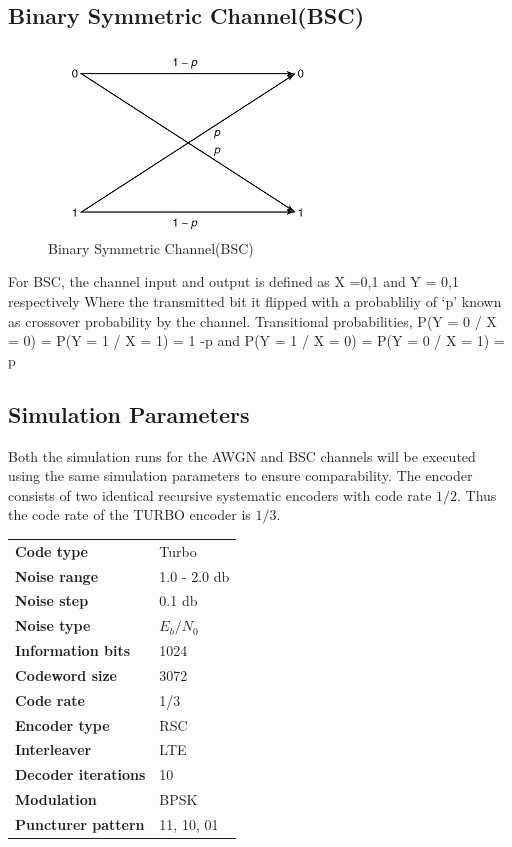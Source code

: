 \documentclass[conference,a4paper]{IEEEtran}
\begin{document}
\subsection{Binary Symmetric Channel(BSC)
}
\begin{figure}[h!]
    \centering
    \includegraphics[scale=0.48]{fig16.jpg}
    \caption{Binary Symmetric Channel(BSC)}
    \label{fig:my_label}
\end{figure}

For BSC, the channel input and output is defined as X ={0,1} and Y = {0,1} respectively
Where the transmitted bit it flipped with a probabliliy of  ‘p’ known as crossover probability by the channel. Transitional probabilities, P(Y = 0 / X = 0) = P(Y = 1 / X = 1) = 1 -p
and P(Y = 1 / X = 0) = P(Y = 0 / X = 1) = p


\subsection{Simulation Parameters}

Both the simulation runs for the AWGN and BSC channels will be executed using the same simulation parameters to ensure comparability. The encoder consists of two identical recursive systematic encoders with code rate $1/2$. Thus the code rate of the TURBO encoder is $1/3$. 

\begin{table}[!htbp]
\centering
\begin{tabular}{|l|l|}
\textbf{Code type }         & Turbo         \\
\textbf{Noise range}        & 1.0 - 2.0 db  \\
\textbf{Noise step}         & 0.1 db        \\
\textbf{Noise type }        & $E_b/N_0$     \\
\textbf{Information bits}   & 1024          \\
\textbf{Codeword size}      & 3072          \\
\textbf{Code rate}          & 1/3           \\
\textbf{Encoder type }      & RSC           \\
\textbf{Interleaver}        & LTE           \\
\textbf{Decoder iterations} & 10            \\
\textbf{Modulation}         & BPSK          \\
\textbf{Puncturer pattern}  & 11, 10, 01 
\end{tabular}
\end{table}
\end{document}
